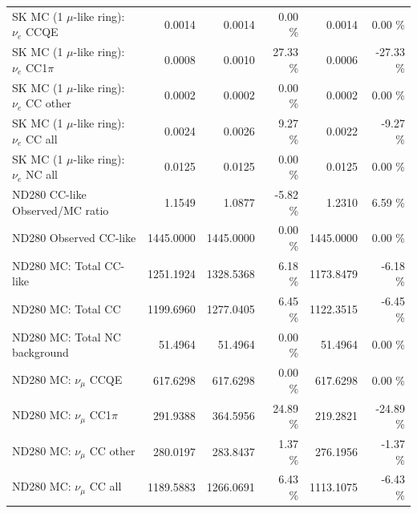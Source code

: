 \begin{table}
\begin{tabular}{| l | r | r  r | r  r |}
                             SK MC (1 $\mu$-like ring): $\nu_{e}$ CCQE &          0.0014 &          0.0014 &  0.00 \%  &          0.0014 &  0.00 \%  \\ 
                         SK MC (1 $\mu$-like ring): $\nu_{e}$ CC1$\pi$ &          0.0008 &          0.0010 & 27.33 \%  &          0.0006 & -27.33 \%  \\ 
                         SK MC (1 $\mu$-like ring): $\nu_{e}$ CC other &          0.0002 &          0.0002 &  0.00 \%  &          0.0002 &  0.00 \%  \\ 
                           SK MC (1 $\mu$-like ring): $\nu_{e}$ CC all &          0.0024 &          0.0026 &  9.27 \%  &          0.0022 & -9.27 \%  \\ 
                           SK MC (1 $\mu$-like ring): $\nu_{e}$ NC all &          0.0125 &          0.0125 &  0.00 \%  &          0.0125 &  0.00 \%  \\ 
\hline
                                       ND280 CC-like Observed/MC ratio &          1.1549 &          1.0877 & -5.82 \%  &          1.2310 &  6.59 \%  \\ 
                                                ND280 Observed CC-like &       1445.0000 &       1445.0000 &  0.00 \%  &       1445.0000 &  0.00 \%  \\ 
                                               ND280 MC: Total CC-like &       1251.1924 &       1328.5368 &  6.18 \%  &       1173.8479 & -6.18 \%  \\ 
                                                    ND280 MC: Total CC &       1199.6960 &       1277.0405 &  6.45 \%  &       1122.3515 & -6.45 \%  \\ 
                                         ND280 MC: Total NC background &         51.4964 &         51.4964 &  0.00 \%  &         51.4964 &  0.00 \%  \\ 
\hline
                                            ND280 MC: $\nu_{\mu}$ CCQE &        617.6298 &        617.6298 &  0.00 \%  &        617.6298 &  0.00 \%  \\ 
                                        ND280 MC: $\nu_{\mu}$ CC1$\pi$ &        291.9388 &        364.5956 & 24.89 \%  &        219.2821 & -24.89 \%  \\ 
                                        ND280 MC: $\nu_{\mu}$ CC other &        280.0197 &        283.8437 &  1.37 \%  &        276.1956 & -1.37 \%  \\ 
                                          ND280 MC: $\nu_{\mu}$ CC all &       1189.5883 &       1266.0691 &  6.43 \%  &       1113.1075 & -6.43 \%  \\ 

\end{tabular}
\end{table}
